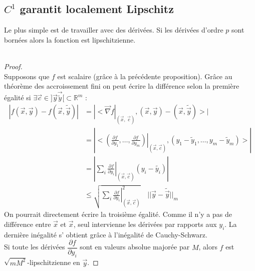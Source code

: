 	
\subsection{$C^1$ garantit localement Lipschitz}
Le plus simple est de travailler avec des dérivées. Si les dérivées d'ordre 
$p$ sont bornées alors la fonction est lipschitzienne.\\
\ 		
\begin{proof}\ \\
	Supposons que $f$ est scalaire (grâce à la précédente proposition). Grâce au 
	théorème des accroissement fini on peut écrire la différence selon la première 
	égalité si $\exists \vec{c} \in ]\vec{y}\vec{\tilde{y}}[\subset \mathbb{R}^m$ :		
	\begin{equation}
		\begin{array}{ll}
			| f (\vec x , \vec y ) - f ( \vec x , \tilde{\vec y} ) | & =                                                               
			{\displaystyle \left | < \vec {\nabla} f  \right |_{( \vec x , \
			\vec c)} , (\vec x , \vec y ) -  ( \vec x , \tilde{\vec y} ) > | }\\
			
			                                                         & = {\displaystyle | \left . \left . < \left (  \frac{\partial f} 
			{\partial y_1}, \ldots , \frac{\partial f}{\partial y_m} \right )
			\right |_{( \vec x , \vec c)} ,  ( y_1 - \tilde{y}_1, \ldots, y_m -
			\tilde{y}_m ) > \right . | }\\
			
			                                                         & ={\displaystyle | \left . \left . \sum_i \frac{\partial f}      
			{\partial y_i} \right |_{( \vec x , \vec c)} ( y_i - \tilde{y_i} )
			\right .  | }\\
			
			                                                         & {\displaystyle \leq \sqrt{\sum_i \left . \frac{\partial f }     
			{\partial y_i} \right | ^2 _{(\vec x , \vec c )}} \quad  || \vec y -
			\tilde{\vec y} ||_m }
		\end{array}
	\end{equation}
	On pourrait directement écrire la 
	troisième égalité. Comme il n'y a pas de différence entre $\vec{x}$ et $\vec{x}$, 
	seul intervienne les dérivées par rapports aux $y_i$. La dernière inégalité s'
	obtient gr\^ace à l'inégalité de Cauchy-Schwarz.\\
	Si toute les dérivées $\dfrac{\partial f}{\partial y_i}$ sont en valeurs absolue 
	majorée par $M$, alors $f$ est $\sqrt{mM^2}$-lipschitzienne en $\vec{y}$.
\end{proof}
		
